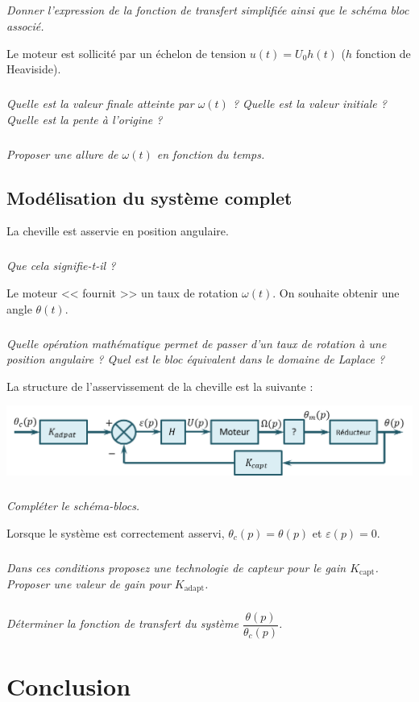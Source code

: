 \documentclass[10pt,fleqn]{article} %
\begin{document}
\begin{multicols}{2}
\subparagraph{}\textit{Donner l'expression de la fonction de transfert simplifiée ainsi que le schéma bloc associé.}


Le moteur est sollicité par un échelon de tension $u(t)=U_0 h(t)$ ($h$ fonction de Heaviside).

\subparagraph{}\textit{Quelle est la valeur finale atteinte par $\omega(t)$ ? Quelle est la valeur initiale ? Quelle est la pente à l'origine ?}

\subparagraph{}\textit{Proposer une allure de $\omega(t)$ en fonction du temps.}


\subsection*{Modélisation du système complet}
La cheville est asservie en position angulaire.
\subparagraph{}\textit{Que cela signifie-t-il ?}

\vspace{.25cm}

Le moteur << fournit >> un taux de rotation $\omega(t)$. On souhaite obtenir une angle $\theta(t)$.
\subparagraph{}\textit{Quelle opération mathématique permet de passer d'un taux de rotation à une position angulaire ? Quel est le bloc équivalent  dans le domaine de Laplace ?}

La structure de l'asservissement de la cheville est la suivante :

\begin{center}
\includegraphics[width=\linewidth]{images/fig_04}
\end{center}


\subparagraph{}\textit{Compléter le schéma-blocs.}

\vspace{.25cm}
Lorsque le système est correctement asservi, $\theta_c(p)=\theta(p)$ et $\varepsilon(p)=0$.

\subparagraph{}\textit{Dans ces conditions proposez une technologie de capteur pour le gain $K_{\text{capt}}$. Proposer une valeur de gain pour $K_{\text{adapt}}$.}

\subparagraph{}\textit{Déterminer la fonction de transfert du système $\dfrac{\theta(p)}{\theta_c(p)}$.}
\section*{Conclusion}


\end{multicols}
\end{document}
